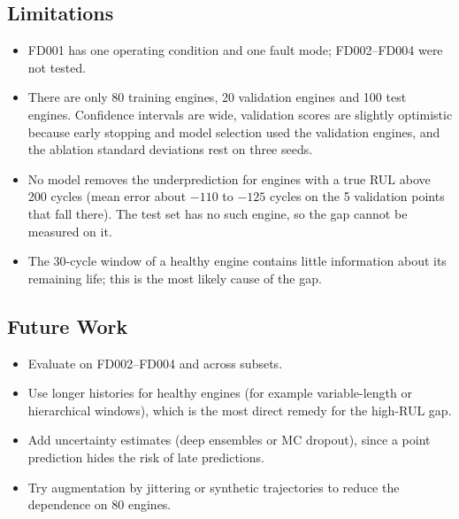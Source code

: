 \subsection{Limitations}
\begin{itemize}
  \item FD001 has one operating condition and one fault mode; FD002--FD004 were not tested.
  \item There are only 80 training engines, 20 validation engines and 100 test engines.  Confidence intervals are wide, validation scores are slightly optimistic
    because early stopping and model selection used the validation engines, and the ablation standard deviations rest on three seeds.
  \item No model removes the underprediction for engines with a true RUL above 200 cycles (mean error about $-110$ to $-125$ cycles on the 5 validation points that fall there).
    The test set has no such engine, so the gap cannot be measured on it.
  \item The 30-cycle window of a healthy engine contains little information about its remaining life; this is the most likely cause of the gap.
\end{itemize}

\subsection{Future Work}
\begin{itemize}
  \item Evaluate on FD002--FD004 and across subsets.
  \item Use longer histories for healthy engines (for example variable-length or hierarchical windows), which is the most direct remedy for the high-RUL gap.
  \item Add uncertainty estimates (deep ensembles or MC dropout), since a point prediction hides the risk of late predictions.
  \item Try augmentation by jittering or synthetic trajectories to reduce the dependence on 80 engines.
\end{itemize}
